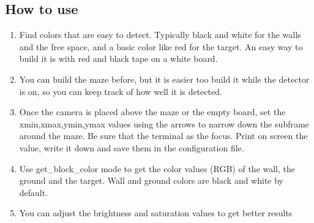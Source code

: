 \subsection{How to use}
    \begin{enumerate}
        \item Find colors that are easy to detect. Typically black and 
            white for the walls and the free space, and a basic color 
            like red for the target. An easy way to build it is with 
            red and black tape on a white board.
        \item You can build the maze before, but it is easier too build 
            it while the detector is on, so you can keep track of how 
            well it is detected.
        \item Once the camera is placed above the maze or the empty board, 
            set the xmin,xmax,ymin,ymax values using the arrows to narrow 
            down the subframe around the maze. Be sure that the terminal 
            as the focus. Print on screen the value, write it down and 
            save them in the configuration file.
        \item Use get\_block\_color mode to get the color values (RGB) 
            of the wall, the ground and the target. Wall and ground 
            colors are black and white by default.
        \item You can adjust the brightness and saturation values to 
            get better results
    \end{enumerate}

